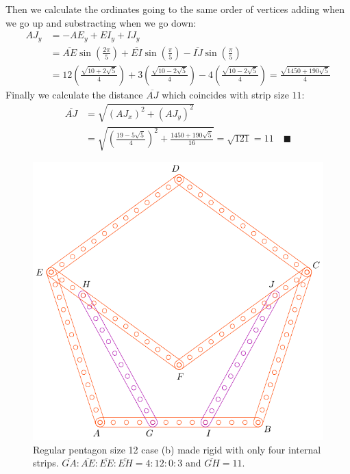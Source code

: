 \documentclass[11pt]{article}
\begin{document}
Then we calculate the ordinates going to the same order of vertices adding when we go up and substracting when we go down:
\begin{align}
AJ_y &= -AE_y + EI_y + IJ_y\nonumber\\
 &= \overline{AE}\sin\left(\frac{2\pi}5\right)
 + \overline{EI}\sin\left(\frac{\pi}5\right) 
 - \overline{IJ}\sin\left(\frac{\pi}5\right)\nonumber\\
 &= 12\left(\frac{\sqrt{10+2\sqrt5}}4\right)
 + 3\left(\frac{\sqrt{10-2\sqrt5}}4\right)
 - 4\left(\frac{\sqrt{10-2\sqrt5}}4\right)%
 = \frac{\sqrt{1450+190\sqrt5}}4
\end{align}
Finally we calculate the distance $\overline{AJ}$ which coincides with strip size $11$:
\begin{align}
\overline{AJ} &= \sqrt{(AJ_x)^2 + (AJ_y)^2}\nonumber\\
 &= \sqrt{\left(\frac{19-5\sqrt5}4\right)^2 + \frac{1450+190\sqrt5}{16}}%
 = \sqrt{121} = 11 \quad\blacksquare
\end{align}

\begin{figure}[h]
 \centering
 \includegraphics[scale=0.8]{12/penta12b}
 \caption{Regular pentagon size 12 case (b) made rigid with only four internal strips. $\overline{GA}:\overline{AE}:\overline{EE}:\overline{EH} = 4:12:0:3$ and $\overline{GH}=11$.}
 \label{fig:penta12b}
\end{figure}
\end{document}
